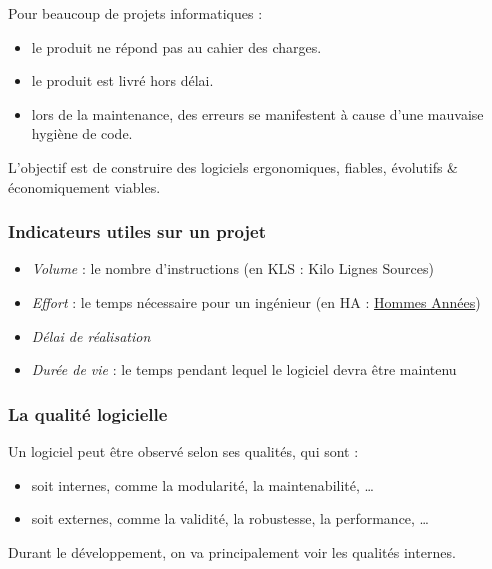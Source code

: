 Pour beaucoup de projets informatiques :

\begin{itemize}
\tightlist
\item
  le produit ne répond pas au cahier des charges.
\item
  le produit est livré hors délai.
\item
  lors de la maintenance, des erreurs se manifestent à cause d'une
  mauvaise hygiène de code.
\end{itemize}

L'objectif est de construire des logiciels ergonomiques, fiables,
évolutifs \& économiquement viables.

\hypertarget{indicateurs-utiles-sur-un-projet}{%
\subsubsection{Indicateurs utiles sur un
projet}\label{indicateurs-utiles-sur-un-projet}}

\begin{itemize}
\tightlist
\item
  \emph{Volume} : le nombre d'instructions (en KLS : Kilo Lignes Sources)
\item
  \emph{Effort} : le temps nécessaire pour un ingénieur (en HA :
  \href{https://fr.wiktionary.org/wiki/homme-ann\%C3\%A9e}{Hommes
  Années})
\item
  \emph{Délai de réalisation}
\item
  \emph{Durée de vie} : le temps pendant lequel le logiciel devra être
  maintenu
\end{itemize}

\hypertarget{la-qualituxe9-logicielle}{%
\subsubsection{La qualité logicielle}\label{la-qualituxe9-logicielle}}

Un logiciel peut être observé selon ses qualités, qui sont :

\begin{itemize}
\tightlist
\item
  soit internes, comme la modularité, la maintenabilité, \ldots{}
\item
  soit externes, comme la validité, la robustesse, la performance,
  \ldots{}
\end{itemize}

Durant le développement, on va principalement voir les qualités
internes.


